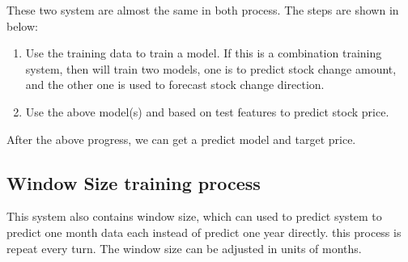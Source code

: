 These two system are almost the same in both process. The steps are shown in below:

\begin{enumerate}
	\item Use the training data to train a model. If this is a combination training system, then will train two models, one is to predict stock change amount, and the other one is used to forecast stock change direction.
	\item Use the above model(s) and based on test features to predict stock price.
\end{enumerate}

After the above progress, we can get a predict model and target price.

\subsection{Window Size training process}
This system also contains window size, which can used to predict system to predict one month data each instead of predict one year directly. this process is repeat every turn. The window size can be adjusted in units of months.


